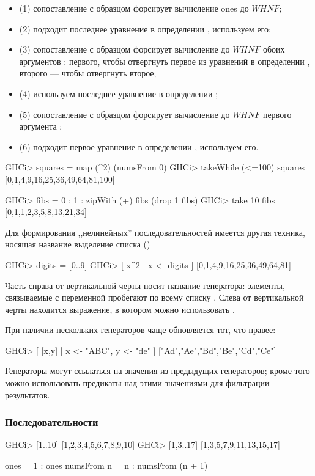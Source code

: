 \documentclass[11pt,a4paper]{article}
\begin{document}
\begin{itemize}
\item (1) сопоставление с образцом форсирует вычисление ones до $WHNF$;
\item (2) подходит последнее уравнение в определении , используем его;
\item (3) сопоставление с образцом форсирует вычисление до $WHNF$ обоих аргументов : первого, чтобы отвергнуть первое из уравнений в определении , второго — чтобы отвергнуть второе;
\item (4) используем последнее уравнение в определении ;
	\item (5) сопоставление с образцом форсирует вычисление до $WHNF$ первого аргумента ;
	\item (6) подходит первое уравнение в определении , используем его.
\end{itemize}

\begin{hscode}
GHCi> squares = map (^2) (numsFrom 0)
GHCi> takeWhile (<=100) squares
[0,1,4,9,16,25,36,49,64,81,100]

GHCi> fibs = 0 : 1 : zipWith (+) fibs (drop 1 fibs)
GHCi> take 10 fibs
[0,1,1,2,3,5,8,13,21,34]
\end{hscode}

Для формирования ,,нелинейных'' последовательностей имеется другая техника, носящая название выделение списка () 
\begin{hscode}
GHCi> digits = [0..9]
GHCi> [ x^2 | x <- digits ]
[0,1,4,9,16,25,36,49,64,81]
\end{hscode}
Часть справа от вертикальной черты носит название генератора: элементы, связываемые с переменной  пробегают по всему списку . Слева от вертикальной черты находится выражение, в котором можно использовать . 

При наличии нескольких генераторов чаще обновляется тот, что правее:
\begin{hscode}
GHCi> [ [x,y] | x <- "ABC", y <- "de" ]
["Ad","Ae","Bd","Be","Cd","Ce"]
\end{hscode}
Генераторы могут ссылаться на значения из предыдущих генераторов; кроме того можно использовать предикаты над этими значениями для фильтрации результатов.

\subsubsection{Последовательности}
\begin{hscode}
GHCi> [1..10]
[1,2,3,4,5,6,7,8,9,10]
GHCi> [1,3..17]
[1,3,5,7,9,11,13,15,17]

ones = 1 : ones
numsFrom n = n : numsFrom (n + 1)
\end{hscode}
\end{document}
